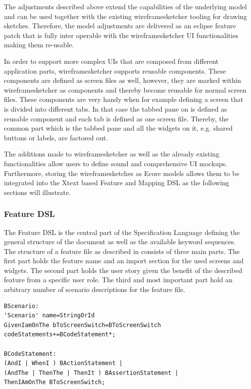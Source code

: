 \documentclass{sig-alternate-05-2015}
\begin{document}
{The adjustments described above extend the capabilities of the underlying model and can be used together with the existing wireframesketcher tooling for drawing sketches.
Therefore, the model adjustments are delivered as an eclipse feature patch that is fully inter operable with the wireframesketcher UI functionalities making them re-usable.

In order to support more complex UIs that are composed from different application parts, wireframesketcher supports reusable components.
These components are defined as screen files as well, however, they are marked within wireframesketcher as components and thereby become reusable for normal screen files.
These components are very handy when for example defining a screen that is divided into different tabs.
In that case the tabbed pane on is defined as reusable component and each tab is defined as one screen file.
Thereby, the common part which is the tabbed pane and all the widgets on it, e.g. shared buttons or labels, are factored out.

The additions made to wireframesketcher as well as the already existing functionalities allow users to define sound and comprehensive UI mockups. 
Furthermore, storing the wireframesketches as Ecore models allows them to be integrated into the Xtext based Feature and Mapping DSL as the following sections will illustrate.

\subsubsection{Feature DSL}
The Feature DSL is the central part of the Specification Language defining the general structure of the document as well as the available keyword sequences.
The structure of a feature file as described in  consists of three main parts.
The first part holds the feature name and an import section for the used screens and widgets.
The second part holds the user story given the benefit of the described feature from a specific user role.
The third and most important part hold an arbitrary number of scenario descriptions for the feature file.

\begin{lstlisting}[captionpos=b, caption=Feature Grammar, label={lst:featureGrammar}, language=xtext]
BScenario:
'Scenario' name=StringOrId
GivenIamOnThe bToScreenSwitch=BToScreenSwitch 
codeStatements+=BCodeStatement*;

BCodeStatement:
(AndI | WhenI ) BActionStatement | 
(AndThe | ThenThe | ThenIt ) BAssertionStatement |   
ThenIAmOnThe BToScreenSwitch;


\end{lstlisting}}
\end{document}
